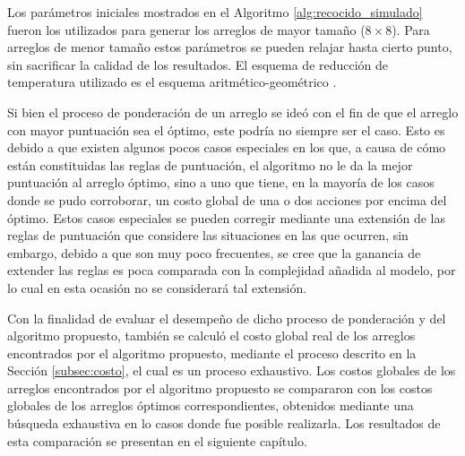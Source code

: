 Los parámetros iniciales mostrados en el Algoritmo \ref{alg:recocido_simulado} fueron los utilizados para generar los arreglos de mayor tamaño ($8\times 8$).
Para arreglos de menor tamaño estos parámetros se pueden relajar hasta cierto punto, sin sacrificar la calidad de los resultados.
El esquema de reducción de temperatura utilizado es el esquema aritmético-geométrico \cite{ouali2017performance}.

Si bien el proceso de ponderación de un arreglo se ideó con el fin de que el arreglo con mayor puntuación sea el óptimo, este podría no siempre ser el caso. 
Esto es debido a que existen algunos pocos casos especiales en los que, a causa de cómo están constituidas las reglas de puntuación, el algoritmo no le da la mejor puntuación al arreglo óptimo, sino a uno que tiene, en la mayoría de los casos donde se pudo corroborar, un costo global de una o dos acciones por encima del óptimo.
Estos casos especiales se pueden corregir mediante una extensión de las reglas de puntuación que considere las situaciones en las que ocurren, sin embargo, debido a que son muy poco frecuentes, se cree que la ganancia de extender las reglas es poca comparada con la complejidad añadida al modelo, por lo cual en esta ocasión no se considerará tal extensión.

Con la finalidad de evaluar el desempeño de dicho proceso de ponderación y del algoritmo propuesto, también se calculó el costo global real de los arreglos encontrados por el algoritmo propuesto, mediante el proceso descrito en la Sección \ref{subsec:costo}, el cual es un proceso exhaustivo.
Los costos globales de los arreglos encontrados por el algoritmo propuesto se compararon con los costos globales de los arreglos óptimos correspondientes, obtenidos mediante una búsqueda exhaustiva en lo casos donde fue posible realizarla. 
Los resultados de esta comparación se presentan en el siguiente capítulo.